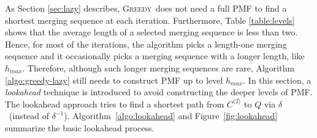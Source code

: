 \documentclass[12pt]{article}
\newcommand{\greedyAlgo}{\textsc{Greedy}}
\begin{document}
As Section \ref{sec:lazy} describes, \greedyAlgo\ does not need a full PMF to find a shortest merging sequence at each iteration. Furthermore, Table \ref{table:levels} shows that the average length of a selected merging sequence is less than two. Hence, for most of the iterations, the algorithm picks a length-one merging sequence and it occasionally picks a merging sequence with a longer length, like $h_{max}$. Therefore, although such longer merging sequences are rare, Algorithm \ref{algo:greedy-lazy} still needs to construct PMF up to level $h_{max}$. In this section, a \textit{lookahead} technique is introduced to avoid constructing the deeper levels of PMF. The lookahead approach tries to find a shortest path from $C^{\langle 2 \rangle}$ to $Q$ via $\delta$~(instead of $\delta^{-1}$). Algorithm~\ref{algo:lookahead} and Figure~\ref{fig:lookahead} summarize the basic lookahead process.
\end{document}
